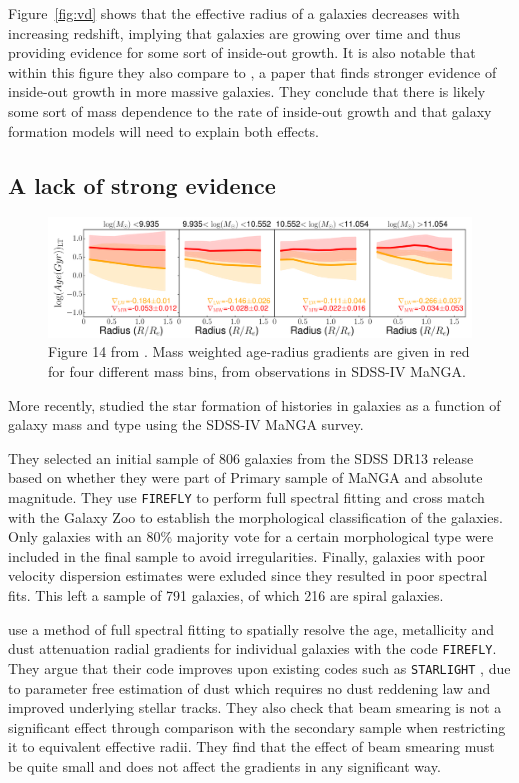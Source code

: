 \documentclass[preprint2]{aastex631}
\begin{document}
Figure~\ref{fig:vd} shows that the effective radius of a galaxies decreases with increasing redshift, implying that galaxies are growing over time and thus providing evidence for some sort of inside-out growth. It is also notable that within this figure they also compare to \citet{Patel+2013}, a paper that finds stronger evidence of inside-out growth in more massive galaxies. They conclude that there is likely some sort of mass dependence to the rate of inside-out growth and that galaxy formation models will need to explain both effects.

\clearpage

\subsection{A lack of strong evidence}

\begin{figure}[t]
    \centering
    \includegraphics[width=\textwidth]{goddard2017_fig14.png}
    \caption{Figure 14 from \citet{Goddard+2017}. Mass weighted age-radius gradients are given in red for four different mass bins, from observations in SDSS-IV MaNGA.}
    \label{fig:goddard}
\end{figure}

More recently, \citet{Goddard+2017} studied the star formation of histories in galaxies as a function of galaxy mass and type using the SDSS-IV MaNGA survey.

They selected an initial sample of 806 galaxies from the SDSS DR13 release based on whether they were part of Primary sample of MaNGA and absolute magnitude. They use \texttt{FIREFLY} to perform full spectral fitting and cross match with the Galaxy Zoo to establish the morphological classification of the galaxies. Only galaxies with an 80\% majority vote for a certain morphological type were included in the final sample to avoid irregularities. Finally, galaxies with poor velocity dispersion estimates were exluded since they resulted in poor spectral fits. This left a sample of 791 galaxies, of which 216 are spiral galaxies.

\citet{Goddard+2017} use a method of full spectral fitting to spatially resolve the age, metallicity and dust attenuation radial gradients for individual galaxies with the code \texttt{FIREFLY}. They argue that their code improves upon existing codes such as \texttt{STARLIGHT} \citep{CidFernandes+2005}, due to parameter free estimation of dust which requires no dust reddening law and improved underlying stellar tracks. They also check that beam smearing is not a significant effect through comparison with the secondary sample when restricting it to equivalent effective radii. They find that the effect of beam smearing must be quite small and does not affect the gradients in any significant way.
\end{document}
